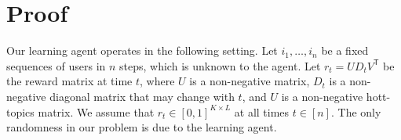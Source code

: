 
\clearpage
\onecolumn
\appendix

\newcommand{\transpose}{^\mathsf{\scriptscriptstyle T}}

\section{Proof}
\label{sec:proof}

Our learning agent operates in the following setting. Let $i_1, \dots, i_n$ be a fixed sequences of users in $n$ steps, which is unknown to the agent. Let $r_t = U D_t V\transpose$ be the reward matrix at time $t$, where $U$ is a non-negative matrix, $D_t$ is a non-negative diagonal matrix that may change with $t$, and $U$ is a non-negative hott-topics matrix. We assume that $r_t \in [0, 1]^{K \times L}$ at all times $t \in [n]$. The only randomness in our problem is due to the learning agent.

